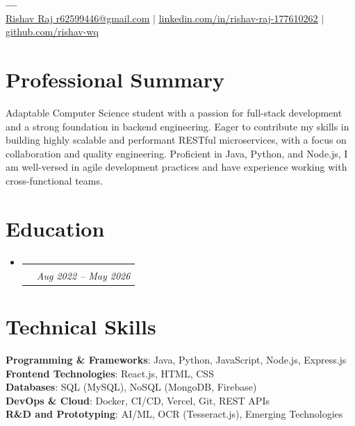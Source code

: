 \documentclass[letterpaper,10.5pt]{article}
\makeatletter
\newcommand{\resumeSubheading}[4]{
  \vspace{-2pt}\item
    \begin{tabular*}{0.97\textwidth}[t]{l@{\extracolsep{\fill}}r}
      \textbf{#1} & #2 \\
      \textit{\small#3} & \textit{\small #4} \\
    \end{tabular*}\vspace{-8pt}
}
\newcommand{\resumeSubHeadingListStart}{\begin{itemize}[leftmargin=0.15in, label={}]}
\newcommand{\resumeSubHeadingListEnd}{\end{itemize}}
\makeatother
\begin{document}
\begin{center}
    \textbf{\Huge \scshape ---} \\ \vspace{1pt}
    \href{mailto:Rishav Raj r62599446@gmail.com}{\underline{Rishav Raj r62599446@gmail.com}} $|$ \href{https://linkedin.com/in/rishav-raj-177610262}{\underline{linkedin.com/in/rishav-raj-177610262}} $|$ \href{https://github.com/rishav-wq}{\underline{github.com/rishav-wq}}
\end{center}

\section{Professional Summary}
Adaptable Computer Science student with a passion for full-stack development and a strong foundation in backend engineering. Eager to contribute my skills in building highly scalable and performant RESTful microservices, with a focus on collaboration and quality engineering. Proficient in Java, Python, and Node.js, I am well-versed in agile development practices and have experience working with cross-functional teams.

\section{Education}
  \resumeSubHeadingListStart
    \resumeSubheading
      {}{}
      {}{Aug 2022 – May 2026}
  \resumeSubHeadingListEnd
\vspace{2pt}

\section{Technical Skills}
 \begin{itemize}[leftmargin=0.15in, label={}]
    \small{\item{
     \textbf{Programming \& Frameworks}{: Java, Python, JavaScript, Node.js, Express.js} \\
     \textbf{Frontend Technologies}{: React.js, HTML, CSS} \\
     \textbf{Databases}{: SQL (MySQL), NoSQL (MongoDB, Firebase)} \\
     \textbf{DevOps \& Cloud}{: Docker, CI/CD, Vercel, Git, REST APIs} \\
     \textbf{R\&D and Prototyping}{: AI/ML, OCR (Tesseract.js), Emerging Technologies} \\
    }}
 \end{itemize}
\end{document}
